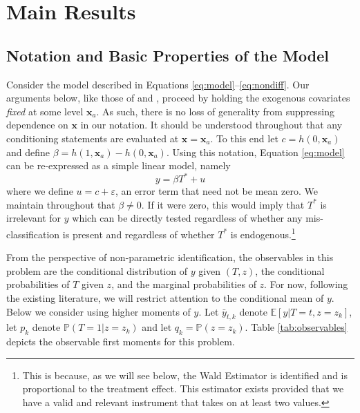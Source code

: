 \section{Main Results}
\subsection{Notation and Basic Properties of the Model}
Consider the model described in Equations \ref{eq:model}--\ref{eq:nondiff}.
Our arguments below, like those of \cite{Mahajan} and \cite{Lewbel}, proceed by holding the exogenous covariates \emph{fixed} at some level $\mathbf{x}_a$.
As such, there is no loss of generality from suppressing dependence on $\mathbf{x}$ in our notation. 
It should be understood throughout that any conditioning statements are evaluated at $\mathbf{x}=\mathbf{x}_a$.
To this end let $c = h(0,\mathbf{x}_a)$ and define $\beta = h(1,\mathbf{x}_a) - h(0,\mathbf{x}_a)$.
Using this notation, Equation \ref{eq:model} can be re-expressed as a simple linear model, namely 
\begin{equation}
  y = \beta T^* + u 
  \label{eq:linear}
\end{equation}
where we define $u = c + \varepsilon$, an error term that need not be mean zero.
We maintain throughout that $\beta \neq 0$.
If it were zero, this would imply that $T^*$ is irrelevant for $y$ which can be directly tested regardless of whether any mis-classification is present and regardless of whether $T^*$ is endogenous.\footnote{This is because, as we will see below, the Wald Estimator is identified and is proportional to the treatment effect. This estimator exists provided that we have a valid and relevant instrument that takes on at least two values.} 

From the perspective of non-parametric identification, the observables in this problem are the conditional distribution of $y$ given $(T,z)$, the conditional probabilities of $T$ given $z$, and the marginal probabilities of $z$.
For now, following the existing literature, we will restrict attention to the conditional mean of $y$.
Below we consider using higher moments of $y$.
Let $\bar{y}_{t,k}$ denote $\mathbb{E}[y|T=t,z=z_k]$, let $p_k$ denote $\mathbb{P}(T=1|z=z_k)$ and let $q_k = \mathbb{P}(z=z_k)$.
Table \ref{tab:observables} depicts the observable first moments for this problem.

